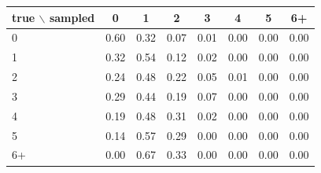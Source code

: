 \begin{tabular}{lccccccc}
\toprule
true $\backslash$ sampled & 0 & 1 & 2 & 3 & 4 & 5 & 6+ \\
\midrule
0 & 0.60 & 0.32 & 0.07 & 0.01 & 0.00 & 0.00 & 0.00 \\
1 & 0.32 & 0.54 & 0.12 & 0.02 & 0.00 & 0.00 & 0.00 \\
2 & 0.24 & 0.48 & 0.22 & 0.05 & 0.01 & 0.00 & 0.00 \\
3 & 0.29 & 0.44 & 0.19 & 0.07 & 0.00 & 0.00 & 0.00 \\
4 & 0.19 & 0.48 & 0.31 & 0.02 & 0.00 & 0.00 & 0.00 \\
5 & 0.14 & 0.57 & 0.29 & 0.00 & 0.00 & 0.00 & 0.00 \\
6+ & 0.00 & 0.67 & 0.33 & 0.00 & 0.00 & 0.00 & 0.00 \\
\bottomrule
\end{tabular}
